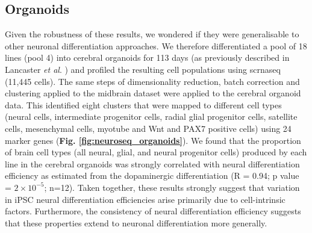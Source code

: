 \subsection{Organoids}
Given the robustness of these results, we wondered if they were generalisable to other neuronal differentiation approaches. 
We therefore differentiated a pool of 18 lines (pool 4) into cerebral organoids for 113 days (as previously described in Lancaster \textit{et al}. \cite{lancaster2017guided}) and profiled the resulting cell populations using \gls{scrnaseq} (11,445 cells). 
The same steps of dimensionality reduction, batch correction and clustering applied to the midbrain dataset were applied to the cerebral organoid data. 
This identified eight clusters that were mapped to different cell types (neural cells, intermediate progenitor cells, radial glial progenitor cells, satellite cells, mesenchymal cells, myotube and Wnt and PAX7 positive cells) using 24 marker genes (\textbf{Fig. \ref{fig:neuroseq_organoids}}).
We found that the proportion of brain cell types (all neural, glial, and neural progenitor cells) produced by each line in the cerebral organoids was strongly correlated with neural differentiation efficiency as estimated from the dopaminergic differentiation (R = 0.94; p value = $2 \times 10^{-5}$; n=12). 
Taken together, these results strongly suggest that variation in iPSC neural differentiation efficiencies arise primarily due to cell-intrinsic factors. 
Furthermore, the consistency of neural differentiation efficiency suggests that these properties extend to neuronal differentiation more generally.


